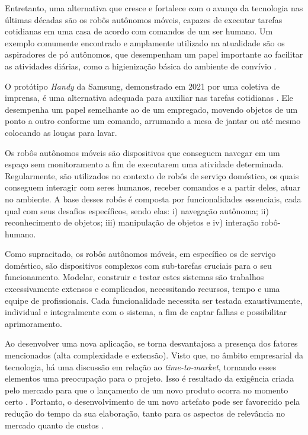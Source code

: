 Entretanto, uma alternativa que cresce e fortalece com o avanço da tecnologia nas últimas décadas são os robôs autônomos móveis, capazes de executar tarefas cotidianas em uma casa de acordo com comandos de um ser humano. Um exemplo comumente encontrado e amplamente utilizado na atualidade são os aspiradores de pó autônomos, que desempenham um papel importante ao facilitar as atividades diárias, como a higienização básica do ambiente de convívio \cite{roombaSite}.

O protótipo \textit{Handy} da Samsung, demonstrado em 2021 por uma coletiva de imprensa, é uma alternativa adequada para auxiliar nas tarefas cotidianas \cite{pressHandy}. Ele desempenha um papel semelhante ao de um empregado,  movendo objetos de um ponto a outro conforme um comando, arrumando a mesa de jantar ou  até mesmo colocando as louças para lavar.

Os robôs autônomos móveis são dispositivos que conseguem navegar em um espaço sem monitoramento a fim de executarem uma atividade determinada. Regularmente, são utilizados no contexto de robôs de serviço doméstico, os quais conseguem interagir com seres humanos, receber comandos e a partir deles, atuar no ambiente. A base desses robôs é composta por funcionalidades essenciais, cada qual com seus desafios específicos, sendo elas: i) navegação autônoma; ii) reconhecimento de objetos; iii) manipulação de objetos e iv) interação robô-humano.

Como supracitado, os robôs autônomos móveis, em específico os de serviço doméstico, são dispositivos complexos com sub-tarefas cruciais para o seu funcionamento. Modelar, construir e testar estes sistemas são trabalhos excessivamente extensos e complicados, necessitando recursos, tempo e uma equipe de profissionais. Cada funcionalidade necessita ser testada exaustivamente, individual e integralmente com o sistema, a fim de captar falhas e possibilitar aprimoramento.

Ao desenvolver uma nova aplicação, se torna desvantajosa a presença dos fatores mencionados  (alta complexidade e extensão). Visto que, no âmbito empresarial da tecnologia, há uma discussão em relação ao \textit{time-to-market}, tornando esses elementos uma preocupação para o projeto. Isso é resultado da exigência criada pelo mercado para que o lançamento de um novo produto ocorra no momento certo \cite{ttmTradeOff:2021,npdTTM:1996, ttmConcurrent:2011}. Portanto, o desenvolvimento de um novo artefato pode ser favorecido pela redução do tempo da sua elaboração, tanto para os aspectos de relevância no mercado quanto de custos \cite{npdTTM:1996, ttmConcurrent:2011}.

